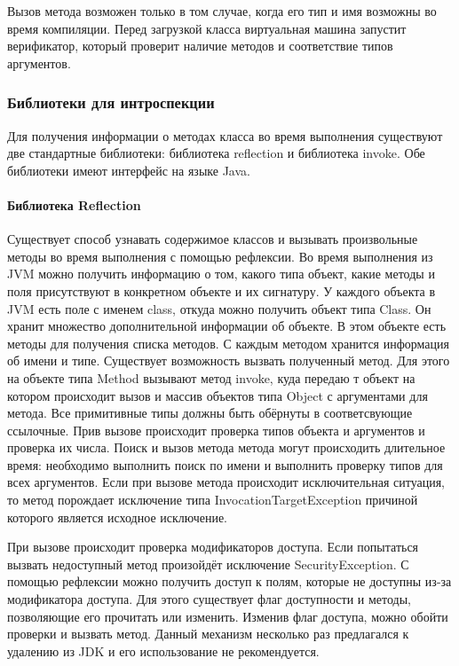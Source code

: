 Вызов метода возможен только в том случае, когда его тип и имя возможны во время компиляции. Перед загрузкой класса виртуальная машина запустит верификатор, который проверит наличие методов и соответствие типов аргументов.

\subsubsection{Библиотеки для интроспекции}
Для получения информации о методах класса во время выполнения существуют две стандартные библиотеки: библиотека reflection и библиотека invoke. Обе библиотеки имеют интерфейс на языке Java.

\paragraph{Библиотека Reflection}
Существует способ узнавать содержимое классов и вызывать произвольные методы во время выполнения с помощью рефлексии\cite{jvm:reflection}. Во время выполнения из JVM можно получить информацию о том, какого типа объект, какие методы и поля присутствуют в конкретном объекте и их сигнатуру. У каждого объекта в JVM есть поле с именем class, откуда можно получить объект типа Class. Он хранит множество дополнительной информации об объекте. В этом объекте есть методы для получения списка методов. С каждым методом хранится информация об имени и типе. Существует возможность вызвать полученный метод. Для этого на объекте типа Method вызывают метод invoke, куда передаю т объект на котором происходит вызов и массив объектов типа Object с аргументами для метода. Все примитивные типы должны быть обёрнуты в соответсвующие ссылочные. Прив вызове происходит проверка типов объекта и аргументов и проверка их числа. Поиск и вызов метода метода могут происходить длительное время: необходимо выполнить поиск по имени и выполнить проверку типов для всех аргументов. Если при вызове метода происходит исключительная ситуация, то метод порождает исключение типа InvocationTargetException причиной которого является исходное исключение.

При вызове происходит проверка модификаторов доступа. Если попытаться вызвать недоступный метод произойдёт исключение SecurityException. С помощью рефлексии можно получить доступ к полям, которые не доступны из-за модификатора доступа. Для этого существует флаг доступности и методы, позволяющие его прочитать или изменить. Изменив флаг доступа, можно обойти проверки и вызвать метод. Данный механизм несколько раз предлагался к удалению из JDK и его использование не рекомендуется.

